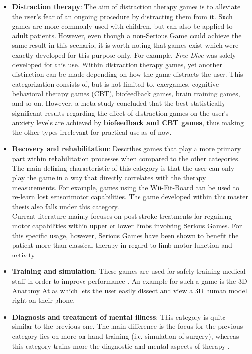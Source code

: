 \documentclass[draft,final]{vutinfth} %
\begin{document}
\begin{itemize}
\item \textbf{Distraction therapy}: The aim of distraction therapy games is to alleviate the user's fear of an ongoing procedure by distracting them from it. Such games are more commonly used with children, but can also be applied to adult patients. However, even though a non-Serious Game could achieve the same result in this scenario, it is worth noting that games exist which were exactly developed for this purpose only. For example, \emph{Free Dive} \cite{dahlquist2008effects} was solely developed for this use. Within distraction therapy games, yet another distinction can be made depending on how the game distracts the user. This categorization consists of, but is not limited to, exergames, cognitive behavioral therapy games (CBT), biofeedback games, brain training games, and so on. However, a meta study \cite{abd2022effectiveness} concluded that the best statistically significant results regarding the effect of distraction games on the user's anxiety levels are achieved by \textbf{biofeedback and CBT games}, thus making the other types irrelevant for practical use as of now.

\item \textbf{Recovery and rehabilitation}: Describes games that play a more primary part within rehabilitation processes when compared to the other categories. The main defining characteristic of this category is that the user can only play the game in a way that directly correlates with the therapy measurements. For example, games using the Wii-Fit-Board can be used to re-learn lost sensorimotor capabilities. The game developed within this master thesis also falls under this category. \\
Current literature mainly focuses on post-stroke treatments for regaining motor capabilities within upper or lower limbs involving Serious Games. For this specific usage, however, Serious Games have been shown to benefit the patient more than classical therapy in regard to limb motor function and activity \cite{doumas2021serious}

\item \textbf{Training and simulation}: These games are used for safely training medical staff in order to improve performance \cite{michael2005serious}. An example for such a game is the 3D Anatomy Atlas \cite{anatomy3D} which lets the user easily dissect and view a 3D human model right on their phone.

\item \textbf{Diagnosis and treatment of mental illness}: This category is quite similar to the previous one. The main difference is the focus for the previous category lies on more on-hand training (i.e. simulation of surgery), whereas this category trains more the diagnostic and mental aspects of therapy \cite{michael2005serious}.


\end{itemize}
\end{document}

